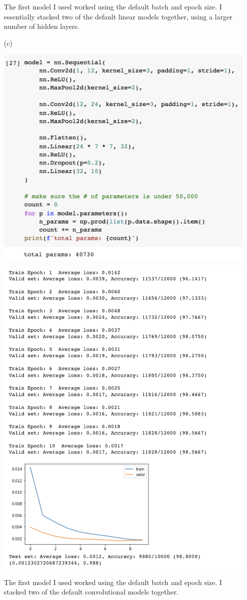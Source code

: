 \documentclass[11pt]{scrartcl}
\begin{document}
\begin{itemize}
The first model I used worked using the default batch and epoch size.  I essentially stacked two of the default linear models together, using a larger number of hidden layers.

\item[(c)]
\begin{center}
\includegraphics[scale=0.5]{convModel.png}
\end{center}

\begin{center}
\includegraphics[scale=0.5]{convResults.png}
\end{center}
The first model I used worked using the default batch and epoch size.  I  stacked two of the default convolutional models together.
\end{itemize}
\pagebreak
\end{document}
